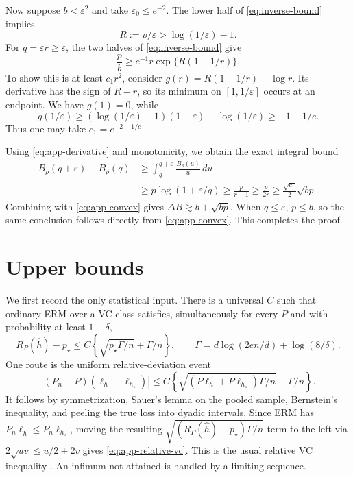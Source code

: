 \documentclass{article}
\theoremstyle{remark}
\newcommand{\eps}{\varepsilon}
\begin{document}
Now suppose $b<\eps^2$ and take $\eps_0\le e^{-2}$.  The lower half of
\eqref{eq:inverse-bound} implies
\[
 R:=\rho/\eps>\log(1/\eps)-1.
\]
For $q=\eps r\ge\eps$, the two halves of
\eqref{eq:inverse-bound} give
\[
 \frac pb\ge e^{-1}r\exp\{R(1-1/r)\}.
\]
To show this is at least $c_1r^2$, consider
$g(r)=R(1-1/r)-\log r$.  Its derivative has the sign of $R-r$, so its minimum
on $[1,1/\eps]$ occurs at an endpoint.  We have $g(1)=0$, while
\[
 g(1/\eps)\ge(\log(1/\eps)-1)(1-\eps)-\log(1/\eps)
 \ge-1-1/e.
\]
Thus one may take $c_1=e^{-2-1/e}$.

Using \eqref{eq:app-derivative} and monotonicity, we obtain the exact integral
bound
\begin{align*}
 B_\rho(q+\eps)-B_\rho(q)
 &\ge\int_q^{q+\eps}\frac{B_\rho(u)}u\,du\\
 &\ge p\log(1+\eps/q)
 \ge\frac{p}{r+1}\ge\frac{p}{2r}
 \ge\frac{\sqrt{c_1}}2\sqrt{bp}.
\end{align*}
Combining with \eqref{eq:app-convex} gives
$\Delta B\gtrsim b+\sqrt{bp}$.  When $q\le\eps$, $p\le b$, so the same
conclusion follows directly from \eqref{eq:app-convex}.  This completes the
proof.

\section{Upper bounds}
\label{app:upper}

We first record the only statistical input.  There is a universal $C$ such
that ordinary ERM over a VC class satisfies, simultaneously for every
$P$ and with probability at least $1-\delta$,
\begin{equation}
 R_P(\widehat h)-p_\star
 \le C\left\{\sqrt{p_\star\Gamma/n}+\Gamma/n\right\},
 \qquad
 \Gamma=d\log(2en/d)+\log(8/\delta).
 \label{eq:app-relative-vc}
\end{equation}
One route is the uniform relative-deviation event
\[
 |(P_n-P)(\ell_h-\ell_{h_\star})|
 \le C\left\{\sqrt{(P\ell_h+P\ell_{h_\star})\Gamma/n}
 +\Gamma/n\right\}.
\]
It follows by symmetrization, Sauer's lemma on the pooled sample, Bernstein's
inequality, and peeling the true loss into dyadic intervals.  Since ERM has
$P_n\ell_{\widehat h}\le P_n\ell_{h_\star}$, moving the resulting
$\sqrt{(R_P(\widehat h)-p_\star)\Gamma/n}$ term to the left via
$2\sqrt{uv}\le u/2+2v$ gives \eqref{eq:app-relative-vc}.  This is the usual
relative VC inequality \citep{vapnik1971uniform,boucheron2005classification}.
An infimum not attained is handled by a limiting sequence.
\end{document}
